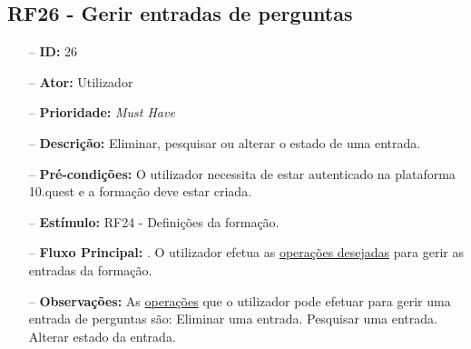 \subsection{RF26 - Gerir entradas de perguntas}
\begin{itemize}
	\item[--] \textbf{ID:} 26
	\item[--]  \textbf{Ator:} Utilizador
	\item[--]  \textbf{Prioridade:} \textit{Must Have}
	\item[--]  \textbf{Descrição:} Eliminar, pesquisar ou alterar o estado de uma entrada.
	\item[--]  \textbf{Pré-condições:} O utilizador necessita de estar autenticado na plataforma 10.quest e a formação deve estar criada.
	\item[--]  \textbf{Estímulo:} RF24 - Definições da formação.
	\item[--]  \textbf{Fluxo Principal:} 
		. O utilizador efetua as \underline{operações desejadas} para gerir as entradas da formação.
	\begin{comment}
	\item[--]  \textbf{Fluxo de Excepção:} 
	\subitem 1a. O 10.quest não consegue efetuar o pedido à API do TCG devido a uma falha na conexão.
	\subitem 1a1. O 10.quest notifica o utilizador que ocorreu uma falha na conexão.
	\subitem 1b. O serviço do TCG (API) está indisponível.
	\subitem 1b1. O 10.quest notifica o utilizador que o serviço do TCG está temporariamente indisponível. 
	\end{comment}
	\item[--]  \textbf{Observações:} As \underline{operações} que o utilizador pode efetuar para gerir uma entrada de perguntas são: 
		\subitem Eliminar uma entrada.
		\subitem Pesquisar uma entrada.
		\subitem Alterar estado da entrada.
\end{itemize}
\newpage

